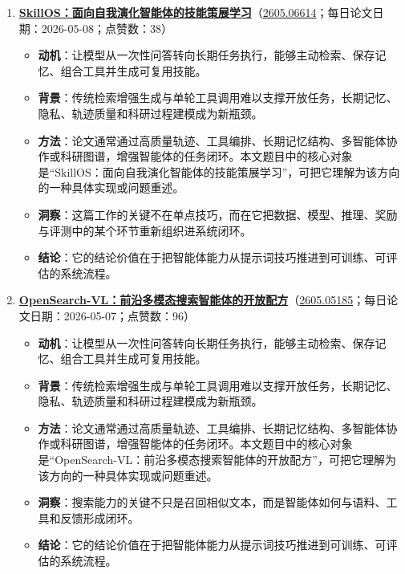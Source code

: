 \begin{enumerate}[leftmargin=1.5em]
\begin{itemize}[leftmargin=1.5em]
    \item \textbf{结论}：它的结论价值在于把智能体能力从提示词技巧推进到可训练、可评估的系统流程。
  \end{itemize}
  \item \textbf{\href{https://huggingface.co/papers/2605.06614}{SkillOS：面向自我演化智能体的技能策展学习}}（\href{https://arxiv.org/abs/2605.06614}{2605.06614}；每日论文日期：2026-05-08；点赞数：38）
  \begin{itemize}[leftmargin=1.5em]
    \item \textbf{动机}：让模型从一次性问答转向长期任务执行，能够主动检索、保存记忆、组合工具并生成可复用技能。
    \item \textbf{背景}：传统检索增强生成与单轮工具调用难以支撑开放任务，长期记忆、隐私、轨迹质量和科研过程建模成为新瓶颈。
    \item \textbf{方法}：论文通常通过高质量轨迹、工具编排、长期记忆结构、多智能体协作或科研图谱，增强智能体的任务闭环。本文题目中的核心对象是“SkillOS：面向自我演化智能体的技能策展学习”，可把它理解为该方向的一种具体实现或问题重述。
    \item \textbf{洞察}：这篇工作的关键不在单点技巧，而在它把数据、模型、推理、奖励与评测中的某个环节重新组织进系统闭环。
    \item \textbf{结论}：它的结论价值在于把智能体能力从提示词技巧推进到可训练、可评估的系统流程。
  \end{itemize}
  \item \textbf{\href{https://huggingface.co/papers/2605.05185}{OpenSearch-VL：前沿多模态搜索智能体的开放配方}}（\href{https://arxiv.org/abs/2605.05185}{2605.05185}；每日论文日期：2026-05-07；点赞数：96）
  \begin{itemize}[leftmargin=1.5em]
    \item \textbf{动机}：让模型从一次性问答转向长期任务执行，能够主动检索、保存记忆、组合工具并生成可复用技能。
    \item \textbf{背景}：传统检索增强生成与单轮工具调用难以支撑开放任务，长期记忆、隐私、轨迹质量和科研过程建模成为新瓶颈。
    \item \textbf{方法}：论文通常通过高质量轨迹、工具编排、长期记忆结构、多智能体协作或科研图谱，增强智能体的任务闭环。本文题目中的核心对象是“OpenSearch-VL：前沿多模态搜索智能体的开放配方”，可把它理解为该方向的一种具体实现或问题重述。
    \item \textbf{洞察}：搜索能力的关键不只是召回相似文本，而是智能体如何与语料、工具和反馈形成闭环。
    \item \textbf{结论}：它的结论价值在于把智能体能力从提示词技巧推进到可训练、可评估的系统流程。

\end{itemize}
\end{enumerate}
